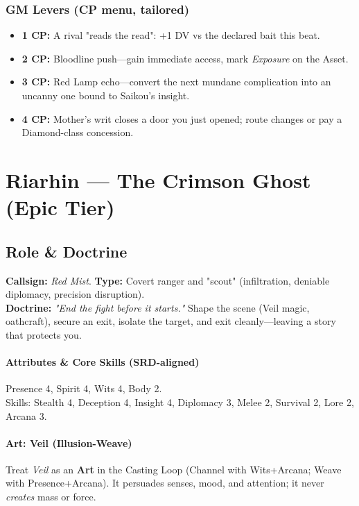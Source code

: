 \subsubsection{GM Levers (CP menu, tailored)}
\begin{itemize}
  \item \textbf{1 CP:} A rival "reads the read": +1 DV vs the declared bait this beat.
  \item \textbf{2 CP:} Bloodline push—gain immediate access, mark \emph{Exposure} on the Asset.
  \item \textbf{3 CP:} Red Lamp echo—convert the next mundane complication into an uncanny one bound to Saikou's insight.
  \item \textbf{4 CP:} Mother's writ closes a door you just opened; route changes or pay a Diamond-class concession.
\end{itemize}

\section{Riarhin — The Crimson Ghost (Epic Tier)}

\subsection{Role \& Doctrine}
\textbf{Callsign:} \emph{Red Mist}. \quad
\textbf{Type:} Covert ranger and "scout" (infiltration, deniable diplomacy, precision disruption). \\
\textbf{Doctrine:} \emph{"End the fight before it starts."} Shape the scene (Veil magic, oathcraft), secure  an exit, isolate the target, and exit cleanly—leaving a story that protects you.

\paragraph{Attributes \& Core Skills (SRD-aligned)}
Presence 4, Spirit 4, Wits 4, Body 2. \\
Skills: Stealth 4, Deception 4, Insight 4, Diplomacy 3, Melee 2, Survival 2, Lore 2, Arcana 3.

\paragraph{Art: Veil (Illusion-Weave)}
Treat \emph{Veil} as an \textbf{Art} in the Casting Loop (Channel with Wits+Arcana; Weave with Presence+Arcana). It persuades senses, mood, and attention; it never \emph{creates} mass or force.

